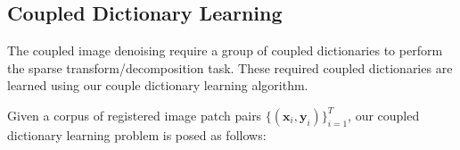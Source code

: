 \documentclass{article}
\begin{document}
\subsection{Coupled Dictionary Learning}


The coupled image denoising require a group of coupled dictionaries to perform the sparse transform/decomposition task. 
These required coupled dictionaries are learned using our couple dictionary learning algorithm.

Given a corpus of registered image patch pairs $\{(\mathbf{x}_i, \mathbf{y}_i) \}_{i=1}^T$, our coupled dictionary learning problem is posed as follows:
%
\end{document}
